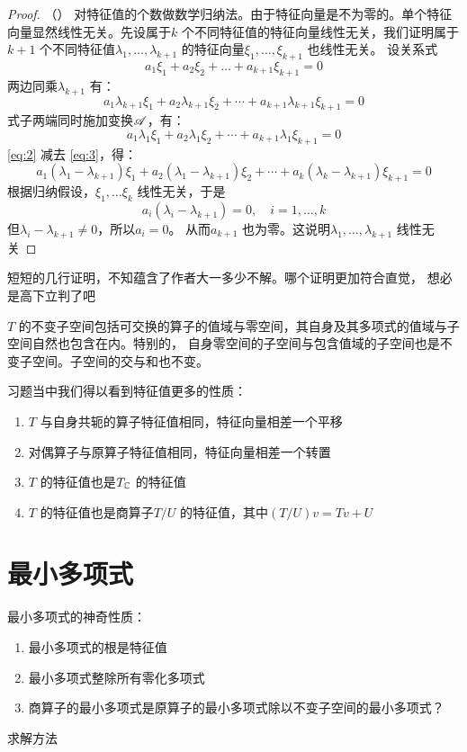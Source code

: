 \begin{proof}
    （\cite[p.~204 定理~8]{高等代数}）
    对特征值的个数做数学归纳法。由于特征向量是不为零的。单个特征向量显然线性无关。先设属于\(k\)
    个不同特征值的特征向量线性无关，我们证明属于\(k+1\) 个不同特征值\(\lambda_1,\dots
    ,\lambda_{k+1}\) 的特征向量\(\xi_1,\dots, \xi_{k+1}\) 也线性无关。
    设关系式
    \begin{equation}
        a_1\xi_1 + a_2\xi_2 + \dots + a_{k+1}\xi_{k+1} = 0 \label{1}
    \end{equation}
    两边同乘\(\lambda_{k+1}\) 有：
    \begin{equation}
        a_1\lambda_{k+1}\xi_1 + a_2\lambda_{k+1}\xi_2 +
        \cdots + a_{k+1}\lambda_{k+1}\xi_{k+1} = 0 \label{eq:2}
    \end{equation}
    式子两端同时施加变换\(\mathscr{A}\)，有：
    \begin{equation}
        a_1\lambda_1\xi_1 + a_2\lambda_1\xi_2 + \cdots +
        a_{k+1}\lambda_1\xi_{k+1} = 0 \label{eq:3}
    \end{equation}
    \cref{eq:2} 减去 \cref{eq:3}，得：
    \[
        a_1(\lambda_1 - \lambda_{k+1})\xi_1 + a_2(\lambda_1
        - \lambda_{k+1})\xi_2 + \cdots +
        a_{k}(\lambda_{k} - \lambda_{k+1})\xi_{k+1} = 0
    \]
    根据归纳假设，\(\xi_1,\dots \xi_{k}\) 线性无关，于是
    \[
        a_{i}(\lambda_{i} - \lambda_{k+1}) = 0, \quad i=1,\dots ,k
    \]
    但\(\lambda_{i}-\lambda_{k+1}\neq 0\)，所以\(a_{i}=0\)。
    从而\(a_{k+1}\) 也为零。这说明\(\lambda_1,\dots ,\lambda_{k+1}\) 线性无关
\end{proof}

短短的几行证明，不知蕴含了作者大一多少不解。哪个证明更加符合直觉，
想必是高下立判了吧

\(T\) 的不变子空间包括可交换的算子的值域与零空间，其自身及其多项式的值域与子空间自然也包含在内。特别的，
自身零空间的子空间与包含值域的子空间也是不变子空间。子空间的交与和也不变。

习题当中我们得以看到特征值更多的性质：
\begin{enumerate}
    \item \(T\) 与自身共轭的算子特征值相同，特征向量相差一个平移
    \item 对偶算子与原算子特征值相同，特征向量相差一个转置
    \item \(T\) 的特征值也是\(T_{\mathbb{C}}\) 的特征值
    \item \(T\) 的特征值也是商算子\(T/U\) 的特征值，其中\((T/U)v=Tv+U\)
\end{enumerate}

\section{最小多项式}


最小多项式的神奇性质：
\begin{enumerate}
    \item 最小多项式的根是特征值
    \item 最小多项式整除所有零化多项式
    \item 商算子的最小多项式是原算子的最小多项式除以不变子空间的最小多项式？
\end{enumerate}
求解方法

